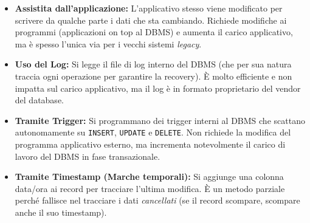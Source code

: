 \begin{table}[H]
    \centering
    \caption{Confronto semplificato tra le tecniche di estrazione (rielaborato dalle slide).}
    \label{tab:tecniche-estrazione}
\end{table}

\begin{itemize}
    \item \textbf{Assistita dall'applicazione:} L'applicativo stesso viene modificato per scrivere da qualche parte i dati che sta cambiando. Richiede modifiche ai programmi (applicazioni on top al DBMS) e aumenta il carico applicativo, ma è spesso l'unica via per i vecchi sistemi \textit{legacy}.
    \item \textbf{Uso del Log:} Si legge il file di log interno del DBMS (che per sua natura traccia ogni operazione per garantire la recovery). È molto efficiente e non impatta sul carico applicativo, ma il log è in formato proprietario del vendor del database.
    \item \textbf{Tramite Trigger:} Si programmano dei trigger interni al DBMS che scattano autonomamente su \texttt{INSERT}, \texttt{UPDATE} e \texttt{DELETE}. Non richiede la modifica del programma applicativo esterno, ma incrementa notevolmente il carico di lavoro del DBMS in fase transazionale.
    \item \textbf{Tramite Timestamp (Marche temporali):} Si aggiunge una colonna data/ora ai record per tracciare l'ultima modifica. È un metodo parziale perché fallisce nel tracciare i dati \textit{cancellati} (se il record scompare, scompare anche il suo timestamp).
\end{itemize}

